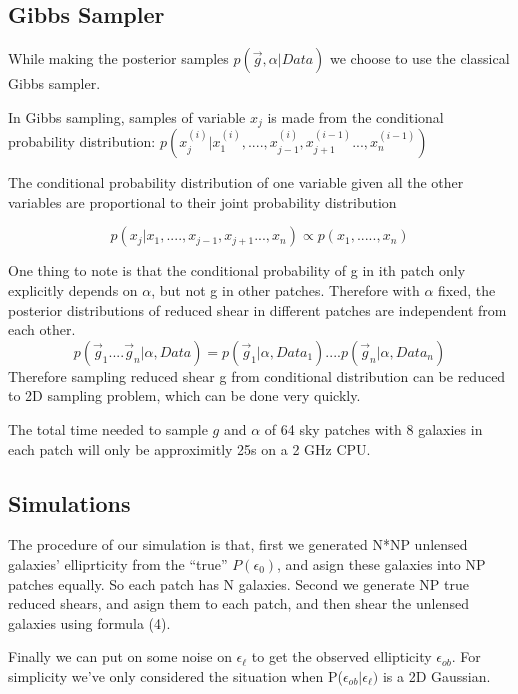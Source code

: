 \documentclass[useAMS,usenatbib]{mn2e}
\begin{document}
\subsection{Gibbs Sampler}

While making the posterior samples $p(\vec{g},\alpha|Data)$ we choose to
use the classical Gibbs sampler.

In Gibbs sampling, samples of variable $x_{j}$ is made from the conditional
probability distribution: $p(x_{j}^{(i)}|x_{1}^{(i)},....,x_{j-1}^{(i)},x_{j+1}^{(i-1)}...,x_{n}^{(i-1)})$

The conditional probability distribution of one variable given all the other variables are proportional to their joint probability distribution

\begin{equation}
p(x_{j}|x_{1},....,x_{j-1},x_{j+1}...,x_{n})\propto p(x_{1},.....,x_{n})
\end{equation}


One thing to note is that the conditional probability of g in ith
patch only explicitly depends on $\alpha$, but not g in other patches. Therefore
with $\alpha$ fixed, the posterior distributions of reduced shear in different patches are independent from each other. 
\begin{equation}
p(\vec{g}_{1}....\vec{g}_{n}|\alpha,Data)=p(\vec{g}_{1}|\alpha,Data_{1})....p(\vec{g}_{n}|\alpha,Data_{n})
\end{equation}
Therefore sampling reduced shear g from conditional distribution can be reduced to 2D sampling problem, which can be done very quickly.

The total time needed to sample $g$ and $\alpha$ of 64 sky patches
with 8 galaxies in each patch will only be approximitly 25s on a 2
GHz CPU.


\subsection{Simulations}

The procedure of our simulation is that, first we generated N{*}NP
unlensed galaxies' elliprticity from the ``true'' $P(\epsilon_{0})$, and
asign these galaxies into NP patches equally. So each patch has N galaxies. Second
we generate NP true reduced shears, and asign them to each patch, and
then shear the unlensed galaxies using formula (4).

Finally we can put on some noise on $\epsilon_{\ell}$ to get the
observed ellipticity $\epsilon_{ob}$. For simplicity we've only considered
the situation when P($\epsilon_{ob}|\epsilon_{\ell})$ is a 2D Gaussian.
\end{document}
